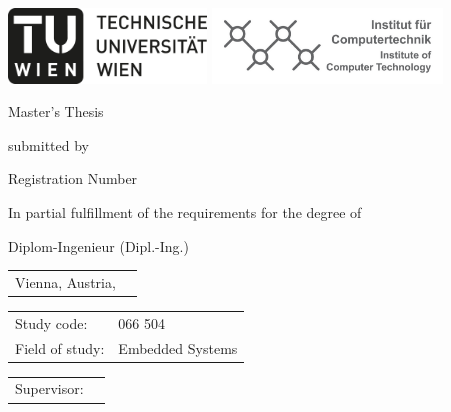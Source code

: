 
%
%
\begin{titlepage}

	\begin{center}

	\includegraphics[height=2cm]{fig/logo-tu-bw.png}%
	\hfill{}%
	\includegraphics[height=2cm]{fig/logo-ict.png}%


	\vspace{5em}

	{\Huge Master's Thesis}
	\vspace{2em}

	{\large submitted by}

	\vspace{3em}

	{\huge \theauthor}

	{\large Registration Number \registrationnumber}

	\vspace{3em}

	{\Huge \thetitle}

	\vspace{3em}
	{\large In partial fulfillment of the requirements for the degree of}

	\vspace{3em}

	{\Large Diplom-Ingenieur (Dipl.-Ing.)}

	\end{center}

	\vspace{3em}

	\large
	\begin{tabular}{m{}m{}}
	Vienna, Austria, \submissiondate & \\
	\end{tabular}

	\vspace{2em}

	\begin{tabular}{m{}m{}}
	Study code:     & 066 504 \\
	Field of study: & Embedded Systems \\
	\end{tabular}

	\vspace{2em}

	\begin{tabular}{m{}m{}}
	Supervisor:    & \supervisor \\
	\end{tabular}

\end{titlepage}
